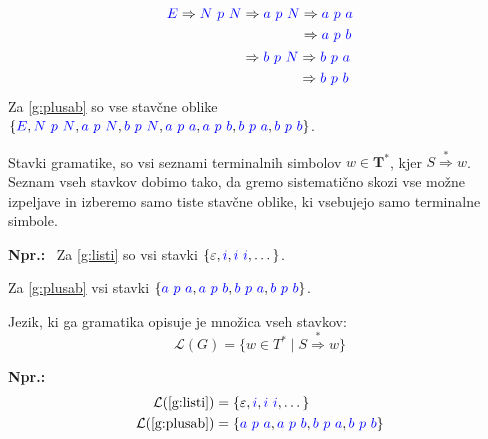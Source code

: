 \documentclass{article}
\newcommand{\Ex}{\textbf{Npr.:}\ }
\newcommand{\Set}[1]{\mathbf{#1}}
\newcommand{\Symbol}[1]{\textcolor{blue}{#1}}
\newcommand{\Grammar}{G}
\newcommand{\Terminals}{\Set{T}}
\newcommand{\StartSymbol}{S}
\newcommand{\Null}{\varepsilon}
\newcommand{\Language}[1]{\mathcal{L}(#1)}
\newcommand{\MathRef}[1]{\text{\ref{#1}}}
\newcommand{\Derive}{\Rightarrow}
\newcommand{\DeriveStar}{\overset{\ast}{\Rightarrow}}
\newcommand{\Seq}{\ }
\newcommand{\Kleene}[1]{#1^\ast}
\begin{document}
  \begin{equation*}
    \Symbol{E} \Derive \Symbol{N} \Seq \Symbol{p} \Seq \Symbol{N} \begin{aligned}[t]
      &\Derive \Symbol{a} \Seq \Symbol{p} \Seq \Symbol{N} \begin{aligned}[t]
        &\Derive \Symbol{a} \Seq \Symbol{p} \Seq \Symbol{a}\\
        &\Derive \Symbol{a} \Seq \Symbol{p} \Seq \Symbol{b}\\
      \end{aligned}\\
      &\Derive \Symbol{b} \Seq \Symbol{p} \Seq \Symbol{N} \begin{aligned}[t]
        &\Derive \Symbol{b} \Seq \Symbol{p} \Seq \Symbol{a}\\
        &\Derive \Symbol{b} \Seq \Symbol{p} \Seq \Symbol{b}\\
      \end{aligned}
    \end{aligned}
  \end{equation*}
Za \ref{g:plusab} so vse stavčne oblike $\{\Symbol{E}, \Symbol{N} \Seq \Symbol{p} \Seq \Symbol{N}, \Symbol{a} \Seq \Symbol{p} \Seq \Symbol{N}, \Symbol{b} \Seq \Symbol{p} \Seq \Symbol{N}, \Symbol{a} \Seq \Symbol{p} \Seq \Symbol{a}, \Symbol{a} \Seq \Symbol{p} \Seq \Symbol{b}, \Symbol{b} \Seq \Symbol{p} \Seq \Symbol{a}, \Symbol{b} \Seq \Symbol{p} \Seq \Symbol{b} \}$.

Stavki gramatike, so vsi seznami terminalnih simbolov $w \in \Kleene{\Terminals}$, kjer $\StartSymbol \DeriveStar w$.
Seznam vseh stavkov dobimo tako, da gremo sistematično skozi vse možne izpeljave in izberemo samo tiste stavčne oblike, ki vsebujejo samo terminalne simbole.

\Ex
Za \ref{g:listi} so vsi stavki $\{\Null, \Symbol{i}, \Symbol{i} \Seq \Symbol{i}, \dots\}$.

Za \ref{g:plusab} vsi stavki $\{\Symbol{a} \Seq \Symbol{p} \Seq \Symbol{a}, \Symbol{a} \Seq \Symbol{p} \Seq \Symbol{b}, \Symbol{b} \Seq \Symbol{p} \Seq \Symbol{a}, \Symbol{b} \Seq \Symbol{p} \Seq \Symbol{b} \}$.

Jezik, ki ga gramatika opisuje je množica vseh stavkov:
\begin{equation*}
  \Language{\Grammar} = \{ w \in \Kleene{T} \mid \StartSymbol \DeriveStar w\}
\end{equation*}

\Ex
  \begin{align*}
    \Language{\MathRef{g:listi}} &= \{\Null, \Symbol{i}, \Symbol{i} \Seq \Symbol{i}, \dots\}\\
    \Language{\MathRef{g:plusab}} &= \{\Symbol{a} \Seq \Symbol{p} \Seq \Symbol{a}, \Symbol{a} \Seq \Symbol{p} \Seq \Symbol{b}, \Symbol{b} \Seq \Symbol{p} \Seq \Symbol{a}, \Symbol{b} \Seq \Symbol{p} \Seq \Symbol{b} \}
  \end{align*}
\end{document}
